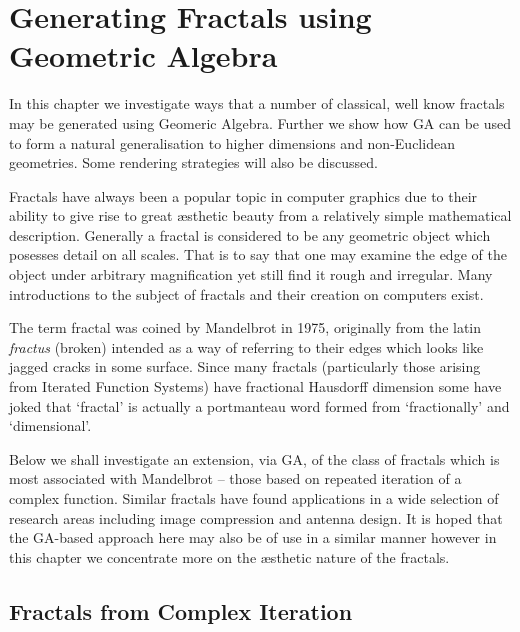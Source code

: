 \chapter{Generating Fractals using Geometric Algebra}

In this chapter we investigate ways that a number of classical, well know
fractals may be generated using Geomeric Algebra. Further we show how
GA can be used to form a natural generalisation to higher dimensions and
non-Euclidean geometries. Some rendering strategies will also be discussed.

Fractals have always been a popular topic in computer graphics due to their
ability to give rise to great \ae sthetic beauty from a relatively simple
mathematical description. Generally a fractal is considered to be any
geometric object which posesses detail on all
scales\cite{FRAC:FractalsEverywhere, FRAC:FractalGeometryOfNature}. That is to
say that one may examine the edge of the object under arbitrary magnification
yet still find it rough and irregular. Many introductions to the subject of
fractals and their creation on computers exist\cite{FRAC:FractalGeometry,
  FRAC:ChaosAndFractals, FRAC:FractalImages}.

The term fractal was coined by Mandelbrot\cite{FRAC:LesObjetsFractals} in 1975,
originally from the latin {\em fractus} (broken) intended as a way of referring
to their edges which looks like jagged cracks in some surface. Since many
fractals (particularly those arising from Iterated Function Systems) have
fractional Hausdorff dimension\cite{FRAC:GeometryOfFractalSets}
some have joked that `fractal' is actually a portmanteau word formed from
`fractionally' and `dimensional'.

Below we shall investigate an extension, via GA, of the class of fractals 
which is most associated with Mandelbrot -- those based on repeated iteration
of a complex function.  Similar fractals have found applications in a wide
selection of research areas including image compression\cite{Barnsley88c,Barnsley93b} and
antenna design\cite{FRAC:Antennas}. It is hoped that the GA-based approach here may
also be of use in a similar manner however in this chapter we concentrate more
on the \ae sthetic nature of the fractals.

\section{Fractals from Complex Iteration}

